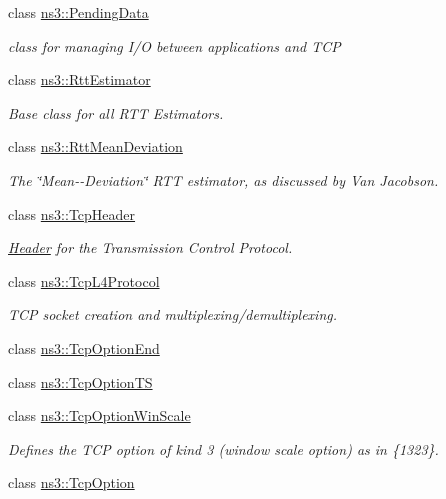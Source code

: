 \begin{DoxyCompactItemize}
\item 
class \hyperlink{classns3_1_1PendingData}{ns3\+::\+Pending\+Data}
\begin{DoxyCompactList}\small\item\em class for managing I/O between applications and T\+CP \end{DoxyCompactList}\item 
class \hyperlink{classns3_1_1RttEstimator}{ns3\+::\+Rtt\+Estimator}
\begin{DoxyCompactList}\small\item\em Base class for all R\+TT Estimators. \end{DoxyCompactList}\item 
class \hyperlink{classns3_1_1RttMeanDeviation}{ns3\+::\+Rtt\+Mean\+Deviation}
\begin{DoxyCompactList}\small\item\em The \char`\"{}\+Mean-\/-\/\+Deviation\char`\"{} R\+TT estimator, as discussed by Van Jacobson. \end{DoxyCompactList}\item 
class \hyperlink{classns3_1_1TcpHeader}{ns3\+::\+Tcp\+Header}
\begin{DoxyCompactList}\small\item\em \hyperlink{classns3_1_1Header}{Header} for the Transmission Control Protocol. \end{DoxyCompactList}\item 
class \hyperlink{classns3_1_1TcpL4Protocol}{ns3\+::\+Tcp\+L4\+Protocol}
\begin{DoxyCompactList}\small\item\em T\+CP socket creation and multiplexing/demultiplexing. \end{DoxyCompactList}\item 
class \hyperlink{classns3_1_1TcpOptionEnd}{ns3\+::\+Tcp\+Option\+End}
\item 
class \hyperlink{classns3_1_1TcpOptionTS}{ns3\+::\+Tcp\+Option\+TS}
\item 
class \hyperlink{classns3_1_1TcpOptionWinScale}{ns3\+::\+Tcp\+Option\+Win\+Scale}
\begin{DoxyCompactList}\small\item\em Defines the T\+CP option of kind 3 (window scale option) as in \{1323\}. \end{DoxyCompactList}\item 
class \hyperlink{classns3_1_1TcpOption}{ns3\+::\+Tcp\+Option}
\item 

\end{DoxyCompactItemize}

